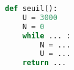 \begin{center}
\begin{lstlisting}[language=Python]
def seuil():
	U = 3000
	N = 0
	while ... :
		N = ...
		U = ...
	return ...
\end{lstlisting}
\end{center}